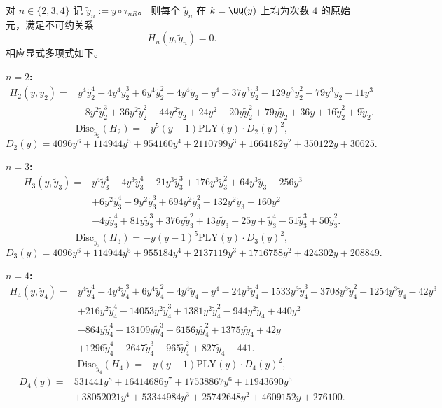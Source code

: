 \begin{conclusion}[平移 \texorpdfstring{$nR$}{nR}（\texorpdfstring{$n=2,3,4$}{n=2,3,4}）的四次原始关系与统一判别式核]\label{con:xi-terminal-zm-translation-nr-quartic-discriminant}
对 \(n\in\{2,3,4\}\) 记 \(\tilde y_{n}:=y\circ\tau_{nR}\)。
则每个 \(\tilde y_n\) 在 \(k=\QQ(y)\) 上均为次数 \(4\) 的原始元，满足不可约关系
\[
H_{n}(y,\tilde y_{n})=0.
\]
相应显式多项式如下。

\medskip
\noindent
\textbf{\(n=2\):}
\[
\boxed{
\begin{aligned}
H_{2}(y,\tilde y_{2})={}&
y^{4}\tilde y_{2}^{4}-4y^{4}\tilde y_{2}^{3}+6y^{4}\tilde y_{2}^{2}-4y^{4}\tilde y_{2}+y^{4}
-37y^{3}\tilde y_{2}^{3}-129y^{3}\tilde y_{2}^{2}-79y^{3}\tilde y_{2}-11y^{3}\\
&-8y^{2}\tilde y_{2}^{3}+36y^{2}\tilde y_{2}^{2}+44y^{2}\tilde y_{2}+24y^{2}
+20y\tilde y_{2}^{2}+79y\tilde y_{2}+36y
+16\tilde y_{2}^{2}+9\tilde y_{2}.
\end{aligned}
}
\]
\[
\boxed{
\mathrm{Disc}_{\tilde y_{2}}(H_{2})
=-y^{5}(y-1)\mathrm{PLY}(y)\cdot D_{2}(y)^{2},
}
\]
\[
D_{2}(y)=4096 y^{6}+114944 y^{5}+954160 y^{4}+2110799 y^{3}+1664182 y^{2}+350122 y+30625.
\]

\medskip
\noindent
\textbf{\(n=3\):}
\[
\boxed{
\begin{aligned}
H_{3}(y,\tilde y_{3})={}&
y^{4}\tilde y_{3}^{4}-4y^{3}\tilde y_{3}^{4}-21y^{3}\tilde y_{3}^{3}+176y^{3}\tilde y_{3}^{2}+64y^{3}\tilde y_{3}-256y^{3}\\
&+6y^{2}\tilde y_{3}^{4}-9y^{2}\tilde y_{3}^{3}+694y^{2}\tilde y_{3}^{2}-132y^{2}\tilde y_{3}-160y^{2}\\
&-4y\tilde y_{3}^{4}+81y\tilde y_{3}^{3}+376y\tilde y_{3}^{2}+13y\tilde y_{3}-25y
+\tilde y_{3}^{4}-51\tilde y_{3}^{3}+50\tilde y_{3}^{2}.
\end{aligned}
}
\]
\[
\boxed{
\mathrm{Disc}_{\tilde y_{3}}(H_{3})
=-y(y-1)^{5}\mathrm{PLY}(y)\cdot D_{3}(y)^{2},
}
\]
\[
D_{3}(y)=4096 y^{6}+114944 y^{5}+955184 y^{4}+2137119 y^{3}+1716758 y^{2}+424302 y+208849.
\]

\medskip
\noindent
\textbf{\(n=4\):}
\[
\boxed{
\begin{aligned}
H_{4}(y,\tilde y_{4})={}&
y^{4}\tilde y_{4}^{4}-4y^{4}\tilde y_{4}^{3}+6y^{4}\tilde y_{4}^{2}-4y^{4}\tilde y_{4}+y^{4}
-24y^{3}\tilde y_{4}^{4}-1533y^{3}\tilde y_{4}^{3}-3708y^{3}\tilde y_{4}^{2}-1254y^{3}\tilde y_{4}-42y^{3}\\
&+216y^{2}\tilde y_{4}^{4}-14053y^{2}\tilde y_{4}^{3}+1381y^{2}\tilde y_{4}^{2}-944y^{2}\tilde y_{4}+440y^{2}\\
&-864y\tilde y_{4}^{4}-13109y\tilde y_{4}^{3}+6156y\tilde y_{4}^{2}+1375y\tilde y_{4}+42y\\
&+1296\tilde y_{4}^{4}-2647\tilde y_{4}^{3}+965\tilde y_{4}^{2}+827\tilde y_{4}-441.
\end{aligned}
}
\]
\[
\boxed{
\mathrm{Disc}_{\tilde y_{4}}(H_{4})
=-y(y-1)\mathrm{PLY}(y)\cdot D_{4}(y)^{2},
}
\]
\[
\begin{aligned}
D_{4}(y)={}&531441 y^{8}+16414686 y^{7}+17538867 y^{6}+11943690 y^{5}\\
&+38052021 y^{4}+53344984 y^{3}+25742648 y^{2}+4609152 y+276100.
\end{aligned}
\]


\end{conclusion}
